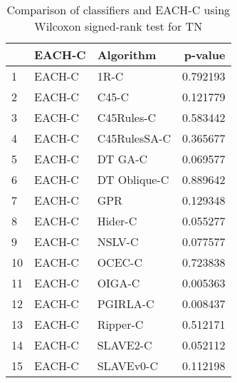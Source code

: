 \begin{table}
\footnotesize
\caption{Comparison of classifiers and EACH-C using Wilcoxon signed-rank test for TN}
\label{tab:EACH-C wilcoxon TN comparison}
\begin{tabular}{lllr}
\hline
 & EACH-C & Algorithm & p-value \\
\hline
1 & EACH-C & 1R-C & 0.792193 \\
2 & EACH-C & C45-C & 0.121779 \\
3 & EACH-C & C45Rules-C & 0.583442 \\
4 & EACH-C & C45RulesSA-C & 0.365677 \\
5 & EACH-C & DT GA-C & 0.069577 \\
6 & EACH-C & DT Oblique-C & 0.889642 \\
7 & EACH-C & GPR & 0.129348 \\
8 & EACH-C & Hider-C & 0.055277 \\
9 & EACH-C & NSLV-C & 0.077577 \\
10 & EACH-C & OCEC-C & 0.723838 \\
11 & EACH-C & OIGA-C & 0.005363 \\
12 & EACH-C & PGIRLA-C & 0.008437 \\
13 & EACH-C & Ripper-C & 0.512171 \\
14 & EACH-C & SLAVE2-C & 0.052112 \\
15 & EACH-C & SLAVEv0-C & 0.112198 \\
\hline
\end{tabular}
\end{table}
